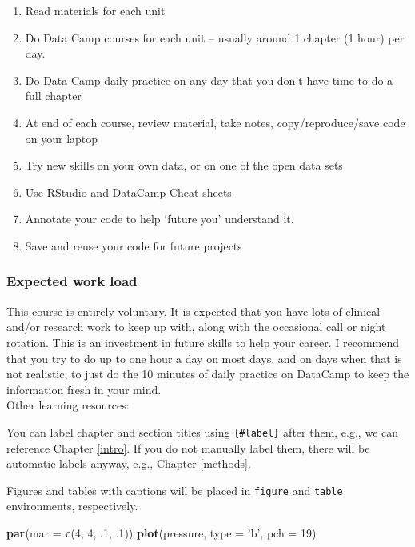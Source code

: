 \documentclass[]{book}
\newenvironment{Shaded}{\begin{snugshade}}{\end{snugshade}}
\newcommand{\DataTypeTok}[1]{\textcolor[rgb]{0.13,0.29,0.53}{#1}}
\newcommand{\DecValTok}[1]{\textcolor[rgb]{0.00,0.00,0.81}{#1}}
\newcommand{\FloatTok}[1]{\textcolor[rgb]{0.00,0.00,0.81}{#1}}
\newcommand{\KeywordTok}[1]{\textcolor[rgb]{0.13,0.29,0.53}{\textbf{#1}}}
\newcommand{\NormalTok}[1]{#1}
\newcommand{\StringTok}[1]{\textcolor[rgb]{0.31,0.60,0.02}{#1}}
\providecommand{\tightlist}{%
  \setlength{\itemsep}{0pt}\setlength{\parskip}{0pt}}
\theoremstyle{definition}
\theoremstyle{definition}
\theoremstyle{definition}
\theoremstyle{remark}
\begin{document}
\begin{enumerate}
\def\labelenumi{\arabic{enumi}.}
\tightlist
\item
  Read materials for each unit
\item
  Do Data Camp courses for each unit -- usually around 1 chapter (1
  hour) per day.
\item
  Do Data Camp daily practice on any day that you don't have time to do
  a full chapter
\item
  At end of each course, review material, take notes,
  copy/reproduce/save code on your laptop
\item
  Try new skills on your own data, or on one of the open data sets
\item
  Use RStudio and DataCamp Cheat sheets
\item
  Annotate your code to help `future you' understand it.
\item
  Save and reuse your code for future projects 
\end{enumerate}

\hypertarget{expected-work-load}{%
\subsubsection{Expected work load}\label{expected-work-load}}

This course is entirely voluntary. It is expected that you have lots of
clinical and/or research work to keep up with, along with the occasional
call or night rotation. This is an investment in future skills to help
your career. I recommend that you try to do up to one hour a day on most
days, and on days when that is not realistic, to just do the 10 minutes
of daily practice on DataCamp to keep the information fresh in your
mind.\\
 Other learning resources:

You can label chapter and section titles using \texttt{\{\#label\}}
after them, e.g., we can reference Chapter \ref{intro}. If you do not
manually label them, there will be automatic labels anyway, e.g.,
Chapter \ref{methods}.

Figures and tables with captions will be placed in \texttt{figure} and
\texttt{table} environments, respectively.

\begin{Shaded}
\begin{Highlighting}[]
\KeywordTok{par}\NormalTok{(}\DataTypeTok{mar =} \KeywordTok{c}\NormalTok{(}\DecValTok{4}\NormalTok{, }\DecValTok{4}\NormalTok{, }\FloatTok{.1}\NormalTok{, }\FloatTok{.1}\NormalTok{))}
\KeywordTok{plot}\NormalTok{(pressure, }\DataTypeTok{type =} \StringTok{'b'}\NormalTok{, }\DataTypeTok{pch =} \DecValTok{19}\NormalTok{)}
\end{Highlighting}
\end{Shaded}
\end{document}
